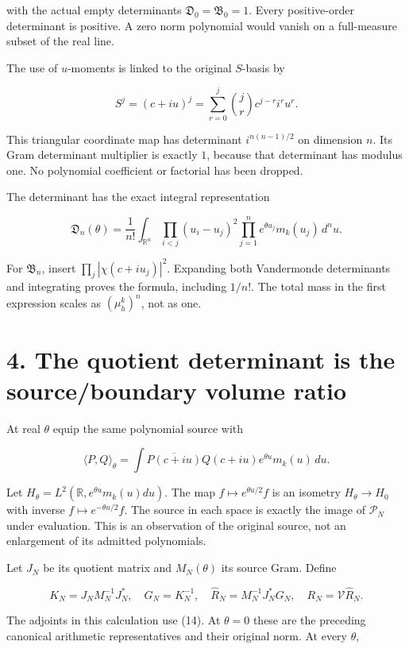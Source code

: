 \documentclass[
  11pt,
]{article}
\begin{document}
with the actual empty determinants \(\mathfrak D_0=\mathfrak B_0=1\).
Every positive-order determinant is positive. A zero norm polynomial
would vanish on a full-measure subset of the real line.

The use of \(u\)-moments is linked to the original \(S\)-basis by

\[
S^j=(c+iu)^j=\sum_{r=0}^j\binom jr c^{j-r}i^ru^r.
\]

This triangular coordinate map has determinant \(i^{n(n-1)/2}\) on
dimension \(n\). Its Gram determinant multiplier is exactly \(1\),
because that determinant has modulus one. No polynomial coefficient or
factorial has been dropped.

The determinant has the exact integral representation

\[
\mathfrak D_n(\theta)=\frac1{n!}\int_{\mathbb R^n}
\prod_{i<j}(u_i-u_j)^2
\prod_{j=1}^ne^{\theta u_j}m_k(u_j)\,d^nu.
\tag{13}
\]

For \(\mathfrak B_n\), insert \(\prod_j|\chi(c+iu_j)|^2\). Expanding
both Vandermonde determinants and integrating proves the formula,
including \(1/n!\). The total mass in the first expression scales as
\((\mu_h^k)^n\), not as one.

\section{4. The quotient determinant is the source/boundary volume
ratio}\label{the-quotient-determinant-is-the-sourceboundary-volume-ratio}

At real \(\theta\) equip the same polynomial source with

\[
\langle P,Q\rangle_\theta
=\int\overline{P(c+iu)}Q(c+iu)e^{\theta u}m_k(u)\,du.
\tag{14}
\]

Let \(H_\theta=L^2(\mathbb R,e^{\theta u}m_k(u)du)\). The map
\(f\mapsto e^{\theta u/2}f\) is an isometry \(H_\theta\to H_0\) with
inverse \(f\mapsto e^{-\theta u/2}f\). The source in each space is
exactly the image of \(\mathcal P_N\) under evaluation. This is an
observation of the original source, not an enlargement of its admitted
polynomials.

Let \(J_N\) be its quotient matrix and \(M_N(\theta)\) its source Gram.
Define

\[
K_N=J_NM_N^{-1}J_N^*,\quad G_N=K_N^{-1},\quad
\widehat R_N=M_N^{-1}J_N^*G_N,\quad R_N=\mathcal V\widehat R_N.
\tag{15}
\]

The adjoints in this calculation use (14). At \(\theta=0\) these are the
preceding canonical arithmetic representatives and their original norm.
At every \(\theta\),
\end{document}
